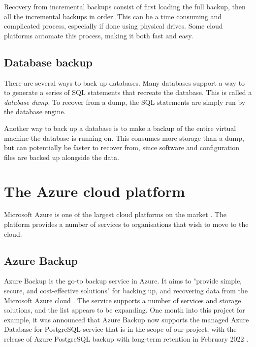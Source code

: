 Recovery from incremental backups consist of first loading the full backup,
then all the incremental backups in order.
This can be a time consuming and complicated process, 
especially if done using physical drives.
Some cloud platforms automate this process,
making it both fast and easy.

\subsection{Database backup}

There are several ways to back up databases.
Many databases support a way to to generate a series of SQL statements that recreate the database.
This is called a \emph{database dump}.
To recover from a dump, the SQL statements are simply run by the database engine.

Another way to back up a database is to make a backup of the entire virtual machine the database is running on.
This consumes more storage than a dump, but can potentially be faster to recover from,
since software and configuration files are backed up alongside the data.


\section{The Azure cloud platform}

Microsoft Azure is one of the largest cloud platforms on the market \cite{richter_amazon_2022}.
The platform provides a number of services to organisations that wish to move to the cloud.




\subsection{Azure Backup} \label{AZBackup}
Azure Backup is the go-to backup service in Azure. It aims to "provide simple, secure, and cost-effective solutions" for backing up, and recovering data from the Microsoft Azure cloud \cite{v-amallick_what_nodate}.
The service supports a number of services and storage solutions, and the list appears to be expanding.
One month into this project for example, it was announced that Azure Backup now supports the managed Azure Database for PostgreSQL-service that is in the scope of our project, with the release of Azure PostgreSQL backup with long-term retention in February 2022 \cite{noauthor_generally_nodate}. 

